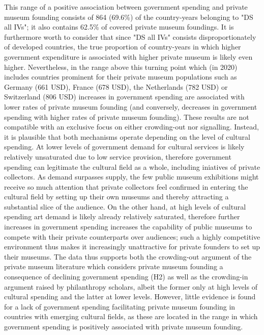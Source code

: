 \documentclass[11pt]{article}
\begin{document}
This range of a positive association between government spending and private museum founding consists of 864 (69.6\%) of the country-years belonging to "DS all IVs"; it also contains 62.5\% of covered private museum foundings.
It is furthermore worth to consider that since "DS all IVs" consists disproportionately of developed countries, the true proportion of country-years in which higher government expenditure is associated with higher private museum is likely even higher.
Nevertheless, in the range above this turning point which (in 2020) includes countries prominent for their private museum populations such as Germany (661 USD), France (678 USD), the Netherlands (782 USD) or Switzerland (806 USD) increases in government spending are associated with lower rates of private museum founding (and conversely, decreases in government spending with higher rates of private museum founding).
These results are not compatible with an exclusive focus on either crowding-out nor signalling.
Instead, it is plausible that both mechanisms operate depending on the level of cultural spending.
At lower levels of government demand for cultural services is likely relatively unsaturated due to low service provision, therefore government spending can legitimate the cultural field as a whole, including iniatives of private collectors.
As demand surpasses supply, the few public museum exhibitions might receive so much attention that private collectors feel confirmed in entering the cultural field by setting up their own museums and thereby attracting a substantial slice of the audience.
On the other hand, at high levels of cultural spending art demand is likely already relatively saturated, therefore further increases in government spending increases the capability of public museums to compete with their private counterparts over audiences; such a highly competitive environment thus makes it increasingly unattractive for private founders to set up their museums. 
The data thus supports both the crowding-out argument of the private museum literature which considers private museum founding a consequence of declining government spending (H2) as well as the crowding-in argument raised by philanthropy scholars, albeit the former only at high levels of cultural spending and the latter at lower levels.
However, little evidence is found for a lack of government spending facilitating private museum founding in countries with emerging cultural fields, as these are located in the range in which government spending is positively associated with private museum founding. 
\end{document}
